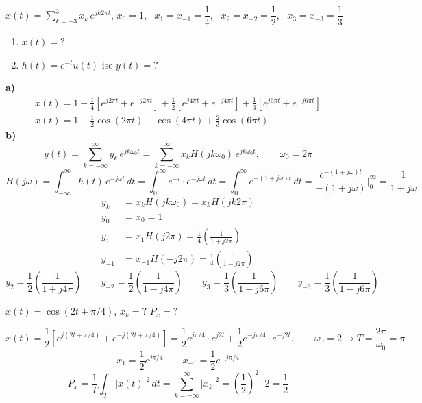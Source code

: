 \documentclass[11pt,a4paper]{article}
\begin{document}
\begin{ornek}[(Ex)]
$x(t) = \displaystyle\sum_{k=-3}^{3} x_k\,e^{jk2\pi t}$, \quad $x_0 = 1$, \ $x_1 = x_{-1} = \dfrac{1}{4}$, \ $x_2 = x_{-2} = \dfrac{1}{2}$, \ $x_3 = x_{-3} = \dfrac{1}{3}$
\begin{enumerate}[label=\alph*)]
  \item $x(t) = ?$
  \item $h(t) = e^{-t}u(t)$ ise $y(t) = ?$
\end{enumerate}
\end{ornek}
\begin{cozum}
\textbf{a)}
\begin{gather*}
  x(t) = 1 + \frac{1}{4}\left[e^{j2\pi t} + e^{-j2\pi t}\right] + \frac{1}{2}\left[e^{j4\pi t} + e^{-j4\pi t}\right] + \frac{1}{3}\left[e^{j6\pi t} + e^{-j6\pi t}\right] \\
  x(t) = 1 + \frac{1}{2}\cos(2\pi t) + \cos(4\pi t) + \frac{2}{3}\cos(6\pi t)
\end{gather*}
\textbf{b)}
\[ y(t) = \sum_{k=-\infty}^{\infty} y_k\,e^{jk\omega_0 t} = \sum_{k=-\infty}^{\infty} x_k H(jk\omega_0)\,e^{jk\omega_0 t}, \qquad \omega_0 = 2\pi \]
\[ H(j\omega) = \int_{-\infty}^{\infty} h(t)\,e^{-j\omega t}\,dt = \int_{0}^{\infty} e^{-t}\cdot e^{-j\omega t}\,dt = \int_{0}^{\infty} e^{-(1+j\omega)t}\,dt = \frac{e^{-(1+j\omega)t}}{-(1+j\omega)}\Bigg|_{0}^{\infty} = \frac{1}{1+j\omega} \]
\begin{align*}
  y_k &= x_k H(jk\omega_0) = x_k H(jk2\pi) \\
  y_0 &= x_0 = 1 \\
  y_1 &= x_1 H(j2\pi) = \frac{1}{4}\left(\frac{1}{1+j2\pi}\right) \\
  y_{-1} &= x_{-1} H(-j2\pi) = \frac{1}{4}\left(\frac{1}{1-j2\pi}\right)
\end{align*}
\[ y_2 = \frac{1}{2}\left(\frac{1}{1+j4\pi}\right) \qquad y_{-2} = \frac{1}{2}\left(\frac{1}{1-j4\pi}\right) \qquad y_3 = \frac{1}{3}\left(\frac{1}{1+j6\pi}\right) \qquad y_{-3} = \frac{1}{3}\left(\frac{1}{1-j6\pi}\right) \]
\end{cozum}

\begin{ornek}[(Ex)]
$x(t) = \cos(2t + \pi/4)$, \quad $x_k = ?$ \quad $P_x = ?$
\end{ornek}
\begin{cozum}
\[ x(t) = \frac{1}{2}\left[e^{j(2t + \pi/4)} + e^{-j(2t + \pi/4)}\right] = \frac{1}{2}e^{j\pi/4}\cdot e^{j2t} + \frac{1}{2}e^{-j\pi/4}\cdot e^{-j2t}, \qquad \omega_0 = 2 \rightarrow T = \frac{2\pi}{\omega_0} = \pi \]
\[ x_1 = \frac{1}{2}e^{j\pi/4} \qquad x_{-1} = \frac{1}{2}e^{-j\pi/4} \]
\[ P_x = \frac{1}{T}\int_{T} |x(t)|^2\,dt = \sum_{k=-\infty}^{\infty} |x_k|^2 = \left(\frac{1}{2}\right)^2\cdot 2 = \frac{1}{2} \]
\end{cozum}
\end{document}
